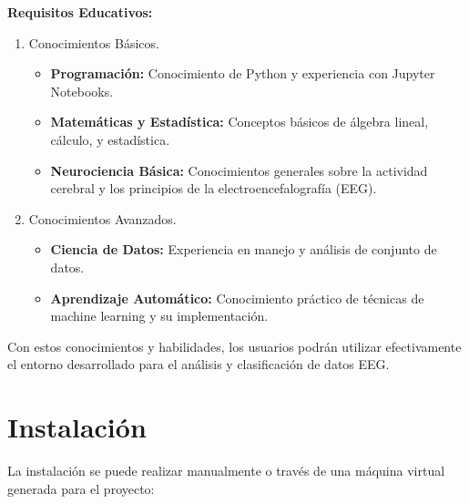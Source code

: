 \textbf{Requisitos Educativos:} 

\begin{enumerate}
\def\labelenumi{\arabic{enumi}.}
\tightlist
\item Conocimientos Básicos.
  \begin{itemize}
   \tightlist
   \item
    \textbf{Programación:} Conocimiento de Python y experiencia con Jupyter Notebooks.
   \item
   \textbf{Matemáticas y Estadística: } Conceptos básicos de álgebra lineal, cálculo, y estadística.
   \item
   \textbf{Neurociencia Básica: }  Conocimientos generales sobre la actividad cerebral y los principios de la electroencefalografía (EEG).
  \end{itemize}
\item Conocimientos Avanzados.
  \begin{itemize}
   \tightlist
   \item
    \textbf{Ciencia de Datos:} Experiencia en manejo y análisis de conjunto de datos.
   \item
   \textbf{Aprendizaje Automático:  } Conocimiento práctico de técnicas de machine learning y su implementación.
  \end{itemize}
\end{enumerate} 
Con estos conocimientos y habilidades, los usuarios podrán utilizar efectivamente el entorno desarrollado para el análisis y clasificación de datos EEG.    
   


\section{Instalación}

La instalación se puede realizar manualmente o  través de una máquina virtual generada para el proyecto:



